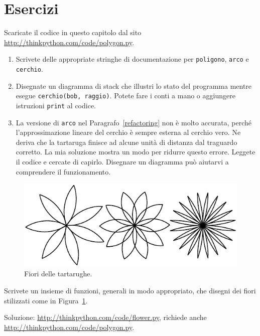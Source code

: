 \documentclass[10pt]{book}
\begin{document}
\section{Esercizi}

\begin{exercise}

Scaricate il codice in questo capitolo dal sito
\url{http://thinkpython.com/code/polygon.py}.

\begin{enumerate}

\item Scrivete delle appropriate stringhe di documentazione per {\tt poligono}, {\tt arco} e
{\tt cerchio}.

\item Disegnate un diagramma di stack che illustri lo stato del programma mentre esegue {\tt cerchio(bob, raggio)}. Potete fare i conti a mano o aggiungere istruzioni {\tt print} al codice.

\item La versione di {\tt arco} nel Paragrafo~\ref{refactoring} non è molto accurata, perché l'approssimazione lineare del cerchio è sempre esterna al cerchio vero. Ne deriva che la tartaruga finisce ad alcune unità di distanza dal traguardo corretto. La mia soluzione mostra un modo per ridurre questo errore. Leggete il codice e cercate di capirlo. Disegnare un diagramma può aiutarvi a comprendere il funzionamento.

\end{enumerate}

\end{exercise}

\begin{figure}
\centerline
{\includegraphics[scale=0.8]{figs/flowers.pdf}}
\caption{Fiori delle tartarughe.}
\label{fig.flowers}
\end{figure}

\vspace{0.2in}
\begin{exercise}

Scrivete un insieme di funzioni, generali in modo appropriato, che disegni dei fiori stilizzati come in Figura~\ref{fig.flowers}.

Soluzione: \url{http://thinkpython.com/code/flower.py},
richiede anche \url{http://thinkpython.com/code/polygon.py}.

\end{exercise}
\end{document}
